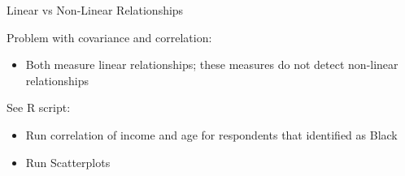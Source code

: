 \documentclass[
  8pt,
  ignorenonframetext,
  dvipsnames]{beamer}
\providecommand{\tightlist}{%
  \setlength{\itemsep}{0pt}\setlength{\parskip}{0pt}}
\let\olditem\item
\renewcommand{\item}{%
  \olditem\vspace{4pt}
}
\begin{document}
\begin{frame}{Linear vs Non-Linear Relationships}
\protect\hypertarget{linear-vs-non-linear-relationships}{}

Problem with covariance and correlation:

\begin{itemize}
\tightlist
\item
  Both measure linear relationships; these measures do not detect
  non-linear relationships
\end{itemize}

\medskip

See R script:

\begin{itemize}
\tightlist
\item
  Run correlation of income and age for respondents that identified as
  Black
\item
  Run Scatterplots
\end{itemize}

\end{frame}
\end{document}
